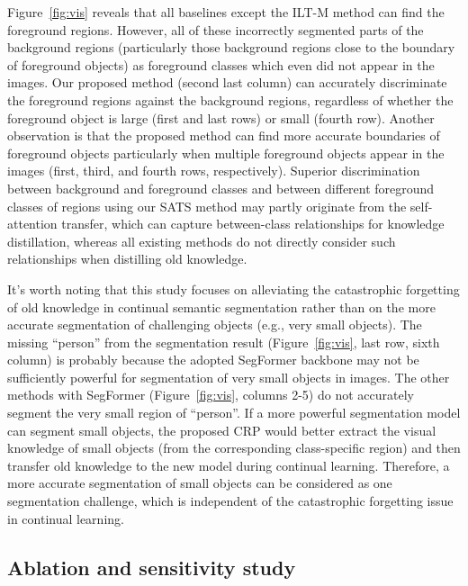 \documentclass[onecolumn,conference,compsoc]{IEEEtran}
\begin{document}
\begin{spacing}{1.5}
Figure~\ref{fig:vis}  {reveals that} all baselines except the ILT-M method can find the foreground regions. However, all of  {these} incorrectly segmented parts of the background regions (particularly those background regions close to the boundary of foreground objects) as foreground classes which {even did not} appear in the images. Our proposed method (second last column) can accurately discriminate the foreground regions against the background regions,  {regardless of} whether the foreground object is large (first and last rows) or small (fourth row). Another observation is that the proposed method can find more accurate boundaries of foreground objects particularly when multiple foreground objects appear in the images (first, third, and fourth  {rows, respectively). Superior} discrimination between background and foreground classes and between different foreground classes of regions  {using} our SATS method may partly  {originate} from the self-attention transfer, which can capture between-class relationships for knowledge distillation,  {whereas} all existing methods do not directly consider such relationships when distilling old knowledge.

It's worth noting that this study focuses on alleviating the catastrophic forgetting of old knowledge in continual semantic segmentation rather than on the more accurate segmentation of challenging objects (e.g., very small objects). The missing “person” from the segmentation result (Figure~\ref{fig:vis}, last row, sixth column) is probably because the adopted SegFormer backbone may not be  {sufficiently} powerful for segmentation of very small objects in images. The other methods with SegFormer (Figure~\ref{fig:vis}, columns 2-5) {do} not  {accurately} segment the very small region of “person”. If a more powerful segmentation model can segment small objects, the proposed CRP would better extract the visual knowledge of small objects (from the corresponding class-specific region) and then transfer old knowledge to the new model during continual learning. Therefore,  {a more accurate segmentation of} small objects can be considered as one segmentation challenge, which is independent of the catastrophic forgetting issue in continual learning.


\subsection{Ablation and sensitivity study}


\end{spacing}
\end{document}
